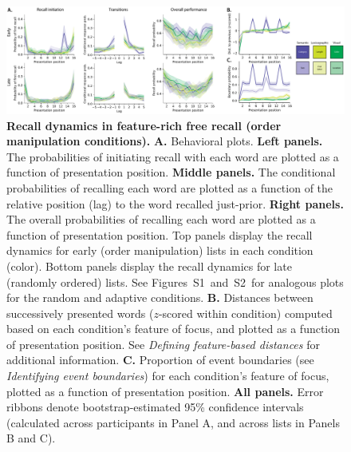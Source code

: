 \documentclass[11pt]{article}
\newcommand{\dynamicsRandom}{S1}
\newcommand{\dynamicsAdaptive}{S2}
\newcommand{\abbreviations}{S1}
\begin{document}
\begin{figure}[tp] \centering
\includegraphics[width=\textwidth]{figures/recall_dynamics}

\caption{\textbf{Recall dynamics in feature-rich free recall (order
manipulation conditions).} \textbf{A.} Behavioral plots. \textbf{Left panels.}
The probabilities of initiating recall with each word are plotted as a function
of presentation position. \textbf{Middle panels.} The conditional probabilities
of recalling each word are plotted as a function of the relative position (lag)
to the word recalled just-prior. \textbf{Right panels.} The overall
probabilities of recalling each word are plotted as a function of presentation
position. Top panels display the recall dynamics for early (order manipulation)
lists in each condition (color). Bottom panels display the recall dynamics for
late (randomly ordered) lists. See
Figures~\dynamicsRandom~and~\dynamicsAdaptive~for analogous plots for the
random and adaptive conditions. \textbf{B.} Distances between successively
presented words ($z$-scored within condition) computed based on each
condition's feature of focus, and plotted as a function of presentation
position. See \textit{Defining feature-based distances} for additional
information. \textbf{C.} Proportion of event boundaries (see
\textit{Identifying event boundaries}) for each condition's feature of focus,
plotted as a function of presentation position. \textbf{All panels.} Error
ribbons denote bootstrap-estimated 95\% confidence intervals (calculated across
participants in Panel A, and across lists in Panels B and C).}

\label{fig:recall-dynamics}
\end{figure}

\begin{table}[tp]
\centering
\tiny


\caption{\textbf{Comparing accuracy on early lists in the order manipulation
versus feature-rich conditions.} The independent samples $t$-tests reported in
the table were carried out across-participants, and reflect data aggregated
across all early lists from each participant. Abbreviations used in this table
are defined in Table~\abbreviations.}

\label{tab:order-manip-vs-feature-rich-accuracy-early}
\end{table}
\end{document}
